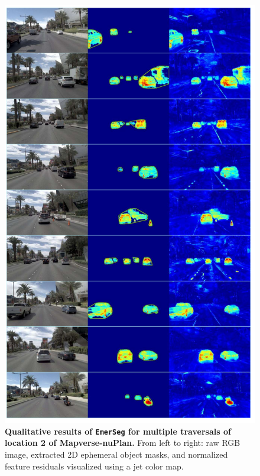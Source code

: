 \begin{figure}[ht]
    \centering
    \includegraphics[width=0.88\linewidth]{figs_compressed/EmerSeg-loc2_compressed.pdf}
    \caption{\textbf{Qualitative results of \texttt{EmerSeg} for multiple traversals of location 2 of Mapverse-nuPlan.} From left to right: raw RGB image, extracted 2D ephemeral object masks, and normalized feature residuals visualized using a jet color map.}
    \label{fig:vegas-loc2}
\end{figure}

